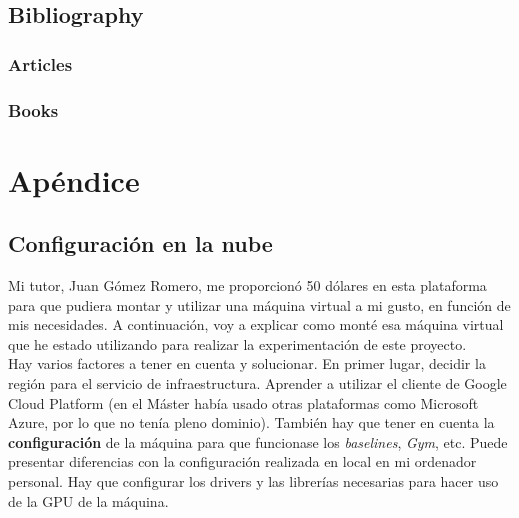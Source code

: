 \documentclass[11pt,fleqn]{book} %
\begin{document}

\chapter*{Bibliography}


\section*{Articles}
\printbibliography[heading=bibempty,type=article]


\section*{Books}
\printbibliography[heading=bibempty,type=book]


\appendix

\part{Apéndice}
\usechapterimagefalse
\chapter{Configuración en la nube}\label{sec:googlecloud}

Mi tutor, Juan Gómez Romero, me proporcionó 50 dólares en esta plataforma para que pudiera montar y utilizar una máquina virtual a mi gusto, en función de mis necesidades. A continuación, voy a explicar como monté esa máquina virtual que he estado utilizando para realizar la experimentación de este proyecto. \\

Hay varios factores a tener en cuenta y solucionar. En primer lugar, decidir la región para el servicio de infraestructura. Aprender a utilizar el cliente de Google Cloud Platform (en el Máster había usado otras plataformas como Microsoft Azure, por lo que no tenía pleno dominio). También hay que tener en cuenta la \textbf{configuración} de la máquina para que funcionase los \textit{baselines}, \textit{Gym}, etc. Puede presentar diferencias con la configuración realizada en local en mi ordenador personal. Hay que configurar los drivers y las librerías necesarias para hacer uso de la GPU de la máquina. \\
\end{document}
